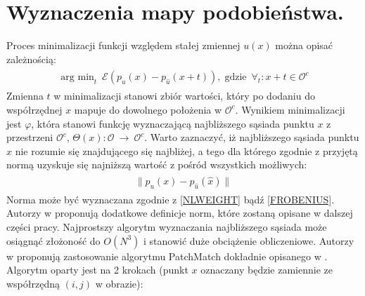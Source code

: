 \documentclass[12pt, twoside, openany]{report}
\theoremstyle{definition}
\begin{document}
\section{Wyznaczenia mapy podobieństwa.}
Proces minimalizacji funkcji względem stałej zmiennej $u(x)$ można opisać zależnością:
\begin{align}
\begin{aligned}
\mathop{\operatorname{arg \ min}}_{t} \ \mathcal{E}\left( p_{u}(x) - p_{\hat{u}}(x+t)\right),\operatorname{gdzie} \ \forall_t : x+t \in \mathcal{O}^c
\label{minNNF}
\end{aligned}
\end{align}
Zmienna $t$ w minimalizacji stanowi zbiór wartości, który po dodaniu do współrzędnej $x$ mapuje do dowolnego położenia w $\mathcal{O}^c$. Wynikiem minimalizacji jest $\varphi$, która stanowi funkcję wyznaczającą najbliższego sąsiada punktu $x$ z przestrzeni $\mathcal{O}^c$, $\Theta(x) :\mathcal{O} \ \rightarrow \ \mathcal{O}^c$. Warto zaznaczyć, iż najbliższego sąsiada punktu $x$ nie rozumie się znajdującego się najbliżej, a tego dla którego zgodnie z przyjętą normą uzyskuje się najniższą wartość z pośród wszystkich możliwych:
\begin{align}
\begin{aligned}
\big\| p_{u}(x) - p_{\hat{u}}(\hat{x}) \big\| 
\label{normNNF}
\end{aligned}
\end{align}
Norma może być wyznaczana zgodnie z \eqref{NLWEIGHT} bądź \eqref{FROBENIUS}. Autorzy w \cite{MathematicalModelsforNLTextureInpainting} proponują dodatkowe definicje norm, które zostaną opisane w dalszej części pracy. Najprostszy algorytm wyznaczania najbliższego sąsiada może osiągnąć złożoność do $O(N^3)$ i stanowić duże obciążenie obliczeniowe. Autorzy w \cite{arias2011variational} proponują zastosowanie algorytmu PatchMatch dokładnie opisanego w \cite{barnes2009patchmatch}. Algorytm oparty jest na 2 krokach (punkt $x$ oznaczany będzie zamiennie ze współrzędną $(i, j)$ w obrazie):
\end{document}
